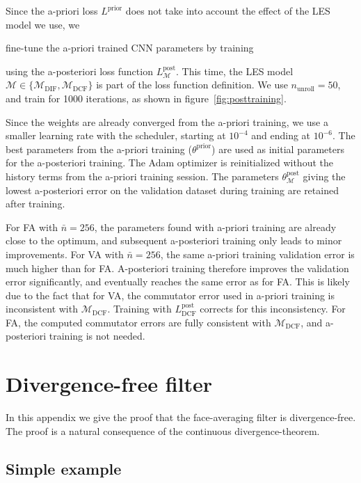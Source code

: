 \documentclass[preprint]{elsarticle}
\newcommand{\R}[1]{}
\newcommand{\revone}[1]{#1}
\begin{document}
Since the a-priori loss $L^\text{prior}$ does not take into account the effect
of the LES model we use, we
\revone{
    \R{finetuning}
    
    fine-tune the a-priori trained CNN parameters by training 
}
using the a-posteriori loss function $L^\text{post}_\mathcal{M}$.
This time, the LES model
$\mathcal{M} \in \{\mathcal{M}_{\text{DIF}}, \mathcal{M}_{\text{DCF}}\}$
is part of the loss function definition. We use
\revone{ $n_\text{unroll} = 50$}, and
train for 1000 iterations\revone{, as shown in figure~\ref{fig:posttraining}}.
\revone{
    Since the weights are already converged from the a-priori training,
    we use a smaller learning rate with the scheduler, starting at $10^{-4}$ and
    ending at $10^{-6}$.}
The best parameters from the
a-priori training ($\theta^\text{prior}$) are used as initial parameters for the
a-posteriori training. The Adam optimizer is reinitialized without the history
terms from the a-priori training session. The parameters
$\theta^\text{post}_\mathcal{M}$ giving the lowest a-posteriori error on the
validation dataset during training are retained after training.

\revone{
    For FA with $\bar{n} = 256$, the parameters found with a-priori training are
    already close to the optimum, and subsequent a-posteriori training only
    leads to minor improvements.
    For VA with $\bar{n} = 256$, the same a-priori training validation error is
    much higher than for FA. A-posteriori training therefore improves the validation
    error significantly, and eventually reaches the same error as for FA. This
    is likely due to the fact that for VA, the commutator error used in a-priori
    training is inconsistent with $\mathcal{M}_\text{DCF}$. Training with
    $L^\text{post}_\text{DCF}$ corrects for this inconsistency. For FA, the
    computed commutator errors are fully consistent with
    $\mathcal{M}_\text{DCF}$, and a-posteriori training is not needed.
}

\section{Divergence-free filter} \label{sec:divfree}

In this appendix we give the proof that the face-averaging filter is
divergence-free. The proof is a natural consequence of the continuous
divergence-theorem.

\subsection{Simple example} \label{sec:divfree_simple}
\end{document}
